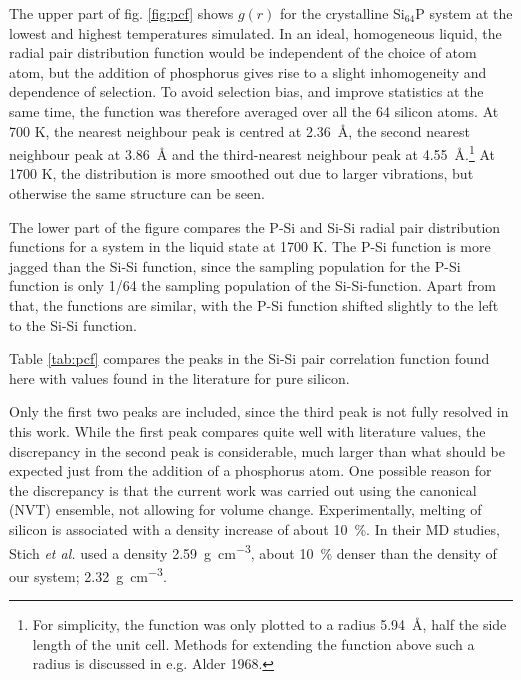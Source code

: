 \documentclass[11pt,bibliography=totoc,index=totoc]{scrbook}   %
\begin{document}
The upper part of fig. \ref{fig:pcf} shows $g(r)$ for the crystalline Si$_{64}$P system at the lowest and highest temperatures simulated.
In an ideal, homogeneous liquid, the radial pair distribution function would be independent of the choice of atom atom, but the addition of phosphorus gives rise to a slight inhomogeneity and dependence of selection.
To avoid selection bias, and improve statistics at the same time, the function was therefore averaged over all the 64 silicon atoms.
At 700 K, the nearest neighbour peak is centred at \SI{2.36}{\angstrom}, 
the second nearest neighbour peak at \SI{3.86}{\angstrom} and the 
third-nearest neighbour peak at \SI{4.55}{\angstrom}.\footnote{
For simplicity, the function was only plotted to a radius \SI{5.94}{\angstrom}, half the side length of the unit cell.
Methods for extending the function above such a radius is discussed in e.g. Alder 1968.}
At 1700 K, the distribution is more smoothed out due to larger vibrations, but otherwise the same structure can be seen.

The lower part of the figure compares the P-Si and Si-Si radial pair distribution functions for a system in the liquid state at 1700 K.
The P-Si function is more jagged than the Si-Si function, since the sampling population for the P-Si function is only 1/64 the sampling population of the Si-Si-function.
Apart from that, the functions are similar, with the P-Si function shifted slightly to the left to the Si-Si function. 

Table \ref{tab:pcf} compares the peaks in the Si-Si pair correlation function found here with values found in the literature for pure silicon. 

Only the first two peaks are included, since the third peak is not fully resolved in this work.
While the first peak compares quite well with literature values, the discrepancy in the second peak is considerable, much
larger than what should be expected just from the addition of a phosphorus atom.
One possible reason for the discrepancy is that the current work was carried out using the canonical (NVT) ensemble, 
not allowing for volume change. 
Experimentally, melting of silicon is associated with a density increase of about 10~\%.\cite{Waseda:1980}
In their MD studies, Stich \textit{et al.} used a density \SI{2.59}{\gram\per\centi\metre\cubed}, about 10~\% denser than the density of our system; \SI{2.32}{\gram\per\centi\metre\cubed}.
\end{document}
